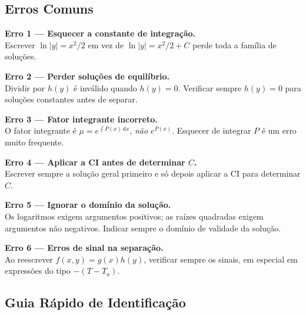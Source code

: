 \documentclass[12pt, a4paper]{article}
\newcommand{\dd}{\mathrm{d}}
\begin{document}
\subsection{Erros Comuns}

\begin{warnbox}
  \textbf{Erro 1 --- Esquecer a constante de integração.}\\
  Escrever $\ln|y| = x^2/2$ em vez de $\ln|y| = x^2/2 + C$ perde toda a família de
  soluções.
\end{warnbox}

\begin{warnbox}
  \textbf{Erro 2 --- Perder soluções de equilíbrio.}\\
  Dividir por $h(y)$ é inválido quando $h(y)=0$. Verificar sempre $h(y)=0$ para soluções
  constantes antes de separar.
\end{warnbox}

\begin{warnbox}
  \textbf{Erro 3 --- Fator integrante incorreto.}\\
  O fator integrante é $\mu = e^{\int P(x)\,\dd x}$, \emph{não} $e^{P(x)}$.
  Esquecer de integrar $P$ é um erro muito frequente.
\end{warnbox}

\begin{warnbox}
  \textbf{Erro 4 --- Aplicar a CI antes de determinar $C$.}\\
  Escrever sempre a solução geral primeiro e só depois aplicar a CI para determinar $C$.
\end{warnbox}

\begin{warnbox}
  \textbf{Erro 5 --- Ignorar o domínio da solução.}\\
  Os logaritmos exigem argumentos positivos; as raízes quadradas exigem argumentos não
  negativos. Indicar sempre o domínio de validade da solução.
\end{warnbox}

\begin{warnbox}
  \textbf{Erro 6 --- Erros de sinal na separação.}\\
  Ao reescrever $f(x,y)=g(x)h(y)$, verificar sempre os sinais, em especial em
  expressões do tipo $-(T-T_a)$.
\end{warnbox}

\subsection{Guia Rápido de Identificação}
\end{document}
